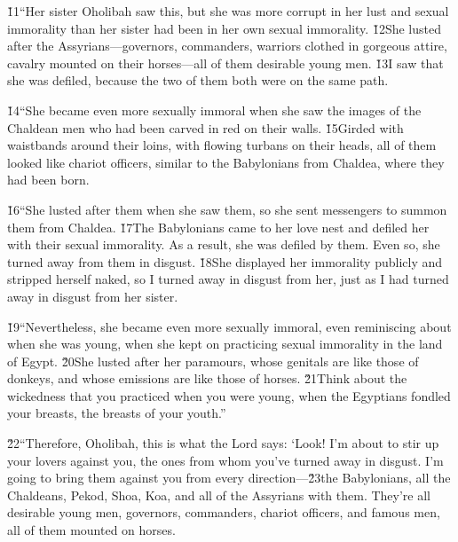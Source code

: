 \v{11}``Her sister Oholibah saw this, but she was more corrupt in her lust and sexual immorality than her sister had been in her own sexual immorality. \v{12}She lusted after the Assyrians---governors, commanders, warriors clothed in gorgeous attire, cavalry mounted on their horses---all of them desirable young men. \v{13}I saw that she was defiled, because the two of them both were on the same path.

\v{14}``She became even more sexually immoral when she saw the images of the Chaldean men who had been carved in red on their walls. \v{15}Girded with waistbands around their loins, with flowing turbans on their heads, all of them looked like chariot officers, similar to the Babylonians from Chaldea, where they had been born.

\v{16}``She lusted after them when she saw them, so she sent messengers to summon them from Chaldea. \v{17}The Babylonians came to her love nest and defiled her with their sexual immorality. As a result, she was defiled by them. Even so, she turned away from them in disgust. \v{18}She displayed her immorality publicly and stripped herself naked, so I turned away in disgust from her, just as I had turned away in disgust from her sister.

\v{19}``Nevertheless, she became even more sexually immoral, even reminiscing about when she was young, when she kept on practicing sexual immorality in the land of Egypt. \v{20}She lusted after her paramours, whose genitals are like those of donkeys, and whose emissions are like those of horses. \v{21}Think about the wickedness that you practiced when you were young, when the Egyptians fondled your breasts, the breasts of your youth.''

\v{22}``Therefore, Oholibah, this is what the Lord  says: `Look! I'm about to stir up your lovers against you, the ones from whom you've turned away in disgust. I'm going to bring them against you from every direction---\v{23}the Babylonians, all the Chaldeans, Pekod, Shoa, Koa, and all of the Assyrians with them. They're all desirable young men, governors, commanders, chariot officers, and famous men, all of them mounted on horses.

